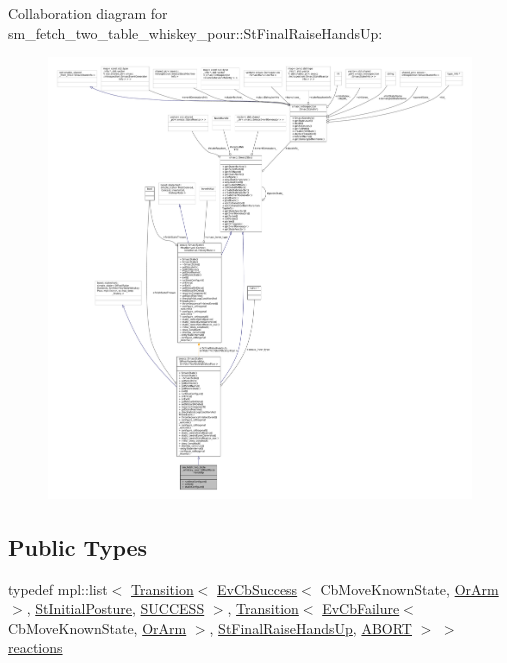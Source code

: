 Collaboration diagram for sm\+\_\+fetch\+\_\+two\+\_\+table\+\_\+whiskey\+\_\+pour\+:\+:St\+Final\+Raise\+Hands\+Up\+:
\nopagebreak
\begin{figure}[H]
\begin{center}
\leavevmode
\includegraphics[width=350pt]{structsm__fetch__two__table__whiskey__pour_1_1StFinalRaiseHandsUp__coll__graph}
\end{center}
\end{figure}
\subsection*{Public Types}
\begin{DoxyCompactItemize}
\item 
typedef mpl\+::list$<$ \hyperlink{classsmacc_1_1Transition}{Transition}$<$ \hyperlink{structsmacc_1_1EvCbSuccess}{Ev\+Cb\+Success}$<$ Cb\+Move\+Known\+State, \hyperlink{classsm__fetch__two__table__whiskey__pour_1_1OrArm}{Or\+Arm} $>$, \hyperlink{structsm__fetch__two__table__whiskey__pour_1_1StInitialPosture}{St\+Initial\+Posture}, \hyperlink{structsmacc_1_1default__transition__tags_1_1SUCCESS}{S\+U\+C\+C\+E\+SS} $>$, \hyperlink{classsmacc_1_1Transition}{Transition}$<$ \hyperlink{structsmacc_1_1EvCbFailure}{Ev\+Cb\+Failure}$<$ Cb\+Move\+Known\+State, \hyperlink{classsm__fetch__two__table__whiskey__pour_1_1OrArm}{Or\+Arm} $>$, \hyperlink{structsm__fetch__two__table__whiskey__pour_1_1StFinalRaiseHandsUp}{St\+Final\+Raise\+Hands\+Up}, \hyperlink{structsmacc_1_1default__transition__tags_1_1ABORT}{A\+B\+O\+RT} $>$ $>$ \hyperlink{structsm__fetch__two__table__whiskey__pour_1_1StFinalRaiseHandsUp_a9b8a865ecbb6cefbba4471fbd57df644}{reactions}
\end{DoxyCompactItemize}
